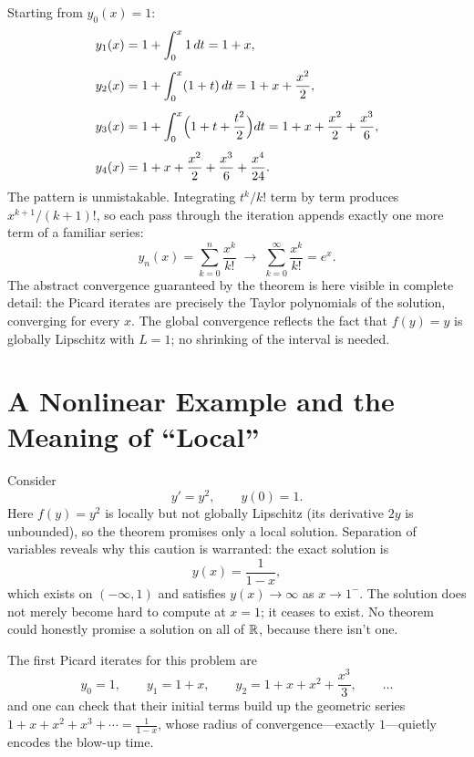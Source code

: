 \documentclass{essay}
\begin{document}
Starting from $y_0(x) = 1$:
\begin{align*}
  y_1(x) &= 1 + \int_0^x 1 \, dt = 1 + x, \\[4pt]
  y_2(x) &= 1 + \int_0^x (1 + t)\, dt = 1 + x + \frac{x^2}{2}, \\[4pt]
  y_3(x) &= 1 + \int_0^x \Bigl( 1 + t + \frac{t^2}{2} \Bigr) dt = 1 + x + \frac{x^2}{2} + \frac{x^3}{6}, \\[4pt]
  y_4(x) &= 1 + x + \frac{x^2}{2} + \frac{x^3}{6} + \frac{x^4}{24}.
\end{align*}
The pattern is unmistakable. Integrating $t^k/k!$ term by term produces $x^{k+1}/(k+1)!$, so each pass through the iteration appends exactly one more term of a familiar series:
\[
  y_n(x) = \sum_{k=0}^{n} \frac{x^k}{k!}
  \;\longrightarrow\;
  \sum_{k=0}^{\infty} \frac{x^k}{k!} = e^x.
\]
The abstract convergence guaranteed by the theorem is here visible in complete detail: the Picard iterates are precisely the Taylor polynomials of the solution, converging for every $x$. The global convergence reflects the fact that $f(y) = y$ is globally Lipschitz with $L = 1$; no shrinking of the interval is needed.

\section{A Nonlinear Example and the Meaning of ``Local''}

\begin{example}
  \label{ex:blowup}
  Consider
  \[
    y' = y^2, \qquad y(0) = 1.
  \]
  Here $f(y) = y^2$ is locally but not globally Lipschitz (its derivative $2y$ is unbounded), so the theorem promises only a local solution. Separation of variables reveals why this caution is warranted: the exact solution is
  \[
    y(x) = \frac{1}{1 - x},
  \]
  which exists on $(-\infty, 1)$ and satisfies $y(x) \to \infty$ as $x \to 1^{-}$. The solution does not merely become hard to compute at $x = 1$; it ceases to exist. No theorem could honestly promise a solution on all of $\mathbb{R}$, because there isn't one.

  The first Picard iterates for this problem are
  \[
    y_0 = 1, \qquad
    y_1 = 1 + x, \qquad
    y_2 = 1 + x + x^2 + \frac{x^3}{3}, \qquad \ldots
  \]
  and one can check that their initial terms build up the geometric series $1 + x + x^2 + x^3 + \cdots = \frac{1}{1-x}$, whose radius of convergence---exactly $1$---quietly encodes the blow-up time.
\end{example}
\end{document}
